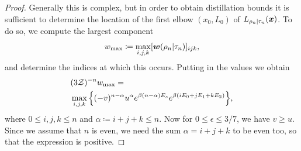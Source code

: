 \begin{proof}
Generally this is complex, but in order to obtain distillation bounds it is sufficient to determine the location of the first elbow $(x_0, L_0)$ of $L_{\rho_n|\tau_n}(\boldsymbol{x})$. To do so, we compute the largest component 
\begin{equation}
	w_{\rm max} \coloneqq \max_{i,j,k} [\boldsymbol{w}(\rho_n | \tau_n)]_{ijk},
\end{equation}
and determine the indices at which this occurs.
Putting in the values we obtain
\begin{align}
	&(3\mathcal{Z})^{-n}w_{\rm max} = \nonumber\\
	&\max\limits_{i,j,k}\Big\{ (-v)^{n-\alpha} u^{\alpha} e^{\beta (n-\alpha)E_s} e^{\beta ( i E_0 + j E_1 + k E_2 )} \Big\}, \label{eq:max_slope}
\end{align}
where $0 \leq i,j,k \leq n$ and $\alpha \coloneqq i+j+k \leq n$.
Now for $0 \leq \epsilon \leq 3/7$, we have $v \geq u$. Since we assume that $n$ is even, we need the sum $\alpha = i+j+k$ to be even too, so that the expression is positive. 


\end{proof}

